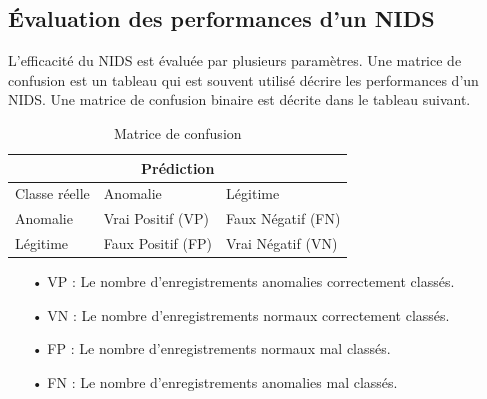 \subsection{Évaluation des performances d'un NIDS}
\label{evaluation}
L'efficacité du NIDS est évaluée par plusieurs paramètres. Une matrice de confusion est un tableau qui est souvent utilisé décrire les performances d'un NIDS. Une matrice de confusion binaire est décrite dans le tableau suivant.
\begin{table}[h]
	\begin{center}
		\begin{tabular}{  | m{4cm} | m{4cm} | m{4cm} | }
			\multicolumn{3}{c}{Prédiction}\\
			\hline
			Classe réelle  & Anomalie & Légitime\\
			\hline
			Anomalie & Vrai Positif (VP) & Faux Négatif (FN)\\
			\hline
			Légitime & Faux Positif (FP) & Vrai Négatif (VN)\\
			\hline
		\end{tabular}
		\caption{Matrice de confusion}
	\end{center}
	\label{table:NIDS_Evaluation}
\end{table}

\begin{itemize}
	\item[• VP] : Le nombre d’enregistrements anomalies correctement classés.
	\item[• VN] : Le nombre d’enregistrements normaux correctement classés.
	\item[• FP] : Le nombre d’enregistrements normaux mal classés.
	\item[• FN] : Le nombre d’enregistrements anomalies mal classés.\\ 
\end{itemize}

